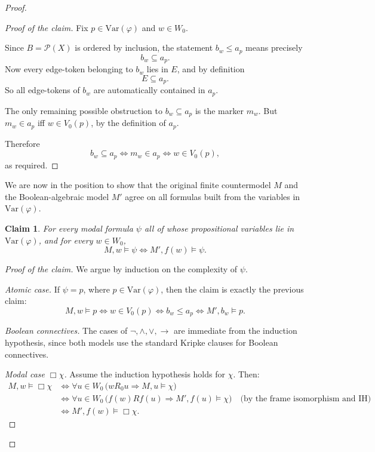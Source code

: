 \documentclass[11pt]{amsart}
\theoremstyle{definition}
\theoremstyle{plain}
\newtheorem{claim}[definition]{Claim}
\newcommand{\Pow}{\mathcal P}
\begin{document}
\begin{proof}
\begin{proof}[Proof of the claim]
Fix $p\in \mathrm{Var}(\varphi)$ and $w\in W_0$.

Since $B=\Pow(X)$ is ordered by inclusion, the statement $b_w\leq a_p$ means precisely
\[
b_w\subseteq a_p.
\]
Now every edge-token belonging to $b_w$ lies in $E$, and by definition
\[
E\subseteq a_p.
\]
So all edge-tokens of $b_w$ are automatically contained in $a_p$.

The only remaining possible obstruction to $b_w\subseteq a_p$ is the marker $m_w$.
But $m_w\in a_p$ iff $w\in V_0(p)$, by the definition of $a_p$.

Therefore
\[
b_w\subseteq a_p \iff m_w\in a_p \iff w\in V_0(p),
\]
as required.
\end{proof}



We are now in the position to show that the original finite countermodel $M$ and the Boolean-algebraic model $M'$ agree
on all formulas built from the variables in $\mathrm{Var}(\varphi)$.

\begin{claim}
For every modal formula $\psi$ all of whose propositional variables lie in $\mathrm{Var}(\varphi)$, and for
every $w\in W_0$,
\[
M,w\models\psi \iff M',f(w)\models\psi.
\]
\end{claim}

\begin{proof}[Proof of the claim]
We argue by induction on the complexity of $\psi$.

\smallskip
\noindent\emph{Atomic case.}
If $\psi=p$, where $p\in \mathrm{Var}(\varphi)$, then the claim is exactly the previous claim:
\[
M,w\models p \iff w\in V_0(p) \iff b_w\leq a_p \iff M',b_w\models p.
\]

\smallskip
\noindent\emph{Boolean connectives.}
The cases of $\neg,\wedge,\vee,\to$ are immediate from the induction hypothesis, since both models
use the standard Kripke clauses for Boolean connectives.

\smallskip
\noindent\emph{Modal case $\Box\chi$.}
Assume the induction hypothesis holds for $\chi$.
Then:
\begin{align*}
M,w\models\Box\chi
&\iff \forall u\in W_0\,\bigl(wR_0u \Rightarrow M,u\models\chi\bigr)\\
&\iff \forall u\in W_0\,\bigl(f(w)Rf(u) \Rightarrow M',f(u)\models\chi\bigr)
\quad\text{(by the frame isomorphism and IH)}\\
&\iff M',f(w)\models\Box\chi.
\end{align*}


\end{proof}
\end{proof}
\end{document}

